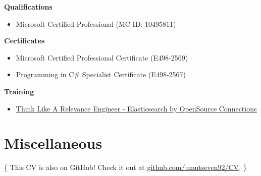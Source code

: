 \documentclass[11pt,a4paper,sans]{moderncv}        %
\begin{document}
\textbf{Qualifications}
\begin{itemize}
\item Microsoft Certified Professional (MC ID: 10495811)
\end{itemize}

\vspace{5pt}

\textbf{Certificates}
\begin{itemize}
\item Microsoft Certified Professional Certificate (E498-2569)
\item Programming in C\# Specialist Certificate (E498-2567)
\end{itemize}

\vspace{5pt}

\textbf{Training}
\begin{itemize}
\item \href{https://badgr.com/public/assertions/m5HJzTYOSBKl15TJ0P3vQw}{\underline{Think Like A Relevance Engineer - Elasticsearch by OpenSource Connections}}
\end{itemize}

\vspace{5pt}


\section{Miscellaneous}



               
\vspace*{\fill}
\color{color2} \centerline{\{ This CV is also on GitHub! Check it out at \href{https://github.com/umutseven92/CV}{github.com/umutseven92/CV}. \}}

\color{color3}
\end{document}
